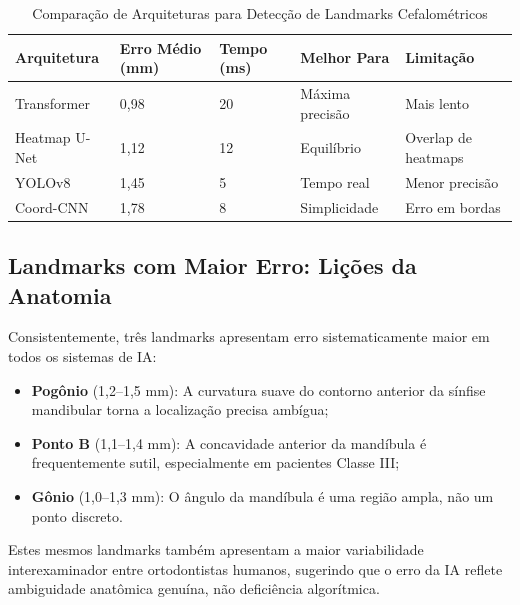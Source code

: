 
\begin{table}[H]
\centering
\caption{Comparação de Arquiteturas para Detecção de Landmarks Cefalométricos}
\label{tab:landmark-arquiteturas}
\begin{tabular}{p{3cm}p{2cm}p{2cm}p{2.5cm}p{3cm}}
\toprule
\textbf{Arquitetura} & \textbf{Erro Médio (mm)} & \textbf{Tempo (ms)} & \textbf{Melhor Para} & \textbf{Limitação} \\
\midrule
Transformer & 0,98 & 20 & Máxima precisão & Mais lento \\
Heatmap U-Net & 1,12 & 12 & Equilíbrio & Overlap de heatmaps \\
YOLOv8 & 1,45 & 5 & Tempo real & Menor precisão \\
Coord-CNN & 1,78 & 8 & Simplicidade & Erro em bordas \\
\bottomrule
\end{tabular}
\end{table}

\subsection{Landmarks com Maior Erro: Lições da Anatomia}

Consistentemente, três landmarks apresentam erro sistematicamente maior em todos os sistemas de IA:
\begin{itemize}
    \item \textbf{Pogônio} (1,2--1,5 mm): A curvatura suave do contorno anterior da sínfise mandibular torna a localização precisa ambígua;
    \item \textbf{Ponto B} (1,1--1,4 mm): A concavidade anterior da mandíbula é frequentemente sutil, especialmente em pacientes Classe III;
    \item \textbf{Gônio} (1,0--1,3 mm): O ângulo da mandíbula é uma região ampla, não um ponto discreto.
\end{itemize}

Estes mesmos landmarks também apresentam a maior variabilidade interexaminador entre ortodontistas humanos, sugerindo que o erro da IA reflete ambiguidade anatômica genuína, não deficiência algorítmica.

